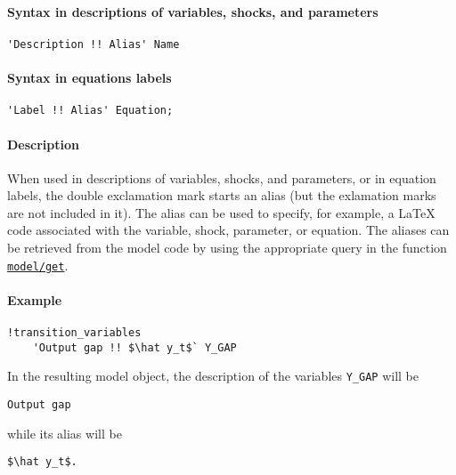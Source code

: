 


	\paragraph{Syntax in descriptions of variables, shocks, and
parameters}

\begin{verbatim}
'Description !! Alias' Name
\end{verbatim}

\paragraph{Syntax in equations labels}

\begin{verbatim}
'Label !! Alias' Equation;
\end{verbatim}

\paragraph{Description}

When used in descriptions of variables, shocks, and parameters, or in
equation labels, the double exclamation mark starts an alias (but the
exlamation marks are not included in it). The alias can be used to
specify, for example, a LaTeX code associated with the variable, shock,
parameter, or equation. The aliases can be retrieved from the model code
by using the appropriate query in the function
\href{model/get}{\texttt{model/get}}.

\paragraph{Example}

\begin{verbatim}
!transition_variables
    'Output gap !! $\hat y_t$` Y_GAP
\end{verbatim}

In the resulting model object, the description of the variables
\texttt{Y\_GAP} will be

\begin{verbatim}
Output gap
\end{verbatim}

while its alias will be

\begin{verbatim}
$\hat y_t$.
\end{verbatim}



